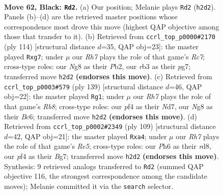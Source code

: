 \documentclass[11pt]{article}
\begin{document}
\clearpage

\begin{figure}[p]\centering
\begin{subfigure}{0.46\textwidth}\centering
\resizebox{\linewidth}{!}{%
\newchessgame
\chessboard[
  setfen={6n1/p6k/P6p/1R3p2/1P3P1b/1R6/2b4r/6K1 b - - 0 62},
  showmover=false,
  pgfstyle=straightmove, color=movearrow, markmove={h2-d2}
]}
\caption{}
\end{subfigure}\hfill
\begin{subfigure}{0.46\textwidth}\centering
\resizebox{\linewidth}{!}{%
\newchessgame
\chessboard[
  setfen={4r3/2R3p1/p2k4/1p5r/8/P1B5/KPP5/8 w - - 0 58},
  showmover=false,
  pgfstyle=straightmove, color=movearrow, markmove={c7-g7}
]}
\caption{}
\end{subfigure}
\\[4pt]
\begin{subfigure}{0.46\textwidth}\centering
\resizebox{\linewidth}{!}{%
\newchessgame
\chessboard[
  setfen={8/1k1n4/2bB2R1/7p/1pP1p2P/8/K1P3N1/1r6 b - - 2 70},
  showmover=false,
  pgfstyle=straightmove, color=movearrow, markmove={b1-g1}
]}
\caption{}
\end{subfigure}\hfill
\begin{subfigure}{0.46\textwidth}\centering
\resizebox{\linewidth}{!}{%
\newchessgame
\chessboard[
  setfen={3R4/p5bk/7p/1P6/P3r3/3K4/2P1p2P/4B3 b - - 3 55},
  showmover=false,
  pgfstyle=straightmove, color=movearrow, markmove={e4-a4}
]}
\caption{}
\end{subfigure}
\caption{\textbf{Move 62, Black: \texttt{Rd2}.} (a) Our position; Melanie plays \texttt{Rd2} (\texttt{h2d2}). Panels (b)--(d) are the retrieved master positions whose correspondence most drove this move (highest QAP objective among those that transfer to it). (b) Retrieved from \texttt{ccrl\_top\_p0000\#2170} (ply 114) [structural distance $d$=35, QAP obj=23]: the master played \texttt{Rxg7}; under $\mu$ our \emph{Rh7} plays the role of that game's \emph{Rc7}; cross-type roles: our \emph{N}g8 as their \emph{P}b2, our \emph{r}b3 as their \emph{p}g7; transferred move \texttt{h2d2} \textbf{(endorses this move)}. (c) Retrieved from \texttt{ccrl\_top\_p0003\#579} (ply 139) [structural distance $d$=46, QAP obj=22]: the master played \texttt{Rg1}; under $\mu$ our \emph{Rh7} plays the role of that game's \emph{Rb8}; cross-type roles: our \emph{p}f4 as their \emph{N}d7, our \emph{N}g8 as their \emph{B}c6; transferred move \texttt{h2d2} \textbf{(endorses this move)}. (d) Retrieved from \texttt{ccrl\_top\_p0002\#2349} (ply 109) [structural distance $d$=42, QAP obj=21]: the master played \texttt{Rxa4}; under $\mu$ our \emph{Rh7} plays the role of that game's \emph{Re5}; cross-type roles: our \emph{P}h6 as their \emph{r}d8, our \emph{p}f4 as their \emph{B}g7; transferred move \texttt{h2d2} \textbf{(endorses this move)}. Synthesis: 9 retrieved analogs transferred to \texttt{Rd2} (summed QAP objective 116, the strongest correspondence among the candidate moves); Melanie committed it via the \texttt{search} selector.}
\label{fig:thought-m123}
\end{figure}
\end{document}
